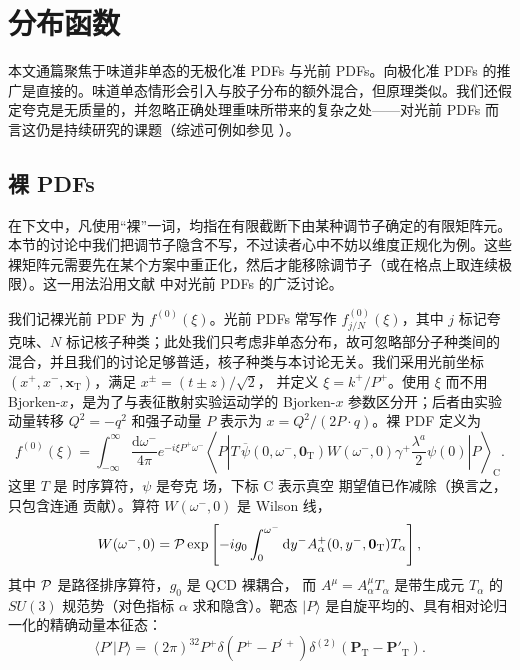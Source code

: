 \section{\label{sec:defs}分布函数}


本文通篇聚焦于味道非单态的无极化准 PDFs 与光前 PDFs。向极化准 PDFs 的推广是直接的。味道单态情形会引入与胶子分布的额外混合，但原理类似。我们还假定夸克是无质量的，并忽略正确处理重味所带来的复杂之处——对光前 PDFs 而言这仍是持续研究的课题（综述可例如参见
\cite{Thorne:2008xf,Olness:2008px,Binoth:2010nha}）。

\subsection{裸 PDFs}

在下文中，凡使用“裸”一词，均指在有限截断下由某种调节子确定的有限矩阵元。本节的讨论中我们把调节子隐含不写，不过读者心中不妨以维度正规化为例。这些裸矩阵元需要先在某个方案中重正化，然后才能移除调节子（或在格点上取连续极限）。这一用法沿用文献
\cite{Collins:1981uw,Collins:2011zzd} 中对光前 PDFs 的广泛讨论。

我们记裸光前 PDF 为
$f^{(0)}(\xi)$。光前 PDFs 常写作
$f_{j/N}^{(0)}(\xi)$，其中 $j$
标记夸克味、$N$ 标记核子种类；此处我们只考虑非单态分布，故可忽略部分子种类间的混合，并且我们的讨论足够普适，核子种类与本讨论无关。我们采用光前坐标
$(x^+,x^-,\boldsymbol{x}_\mathrm{T})$，满足 $x^\pm = (t\pm z)/\sqrt{2}$，
并定义 $\xi=k^+/P^+$。使用 $\xi$ 而不用 Bjorken-$x$，是为了与表征散射实验运动学的 Bjorken-$x$ 参数区分开；后者由实验动量转移 $Q^2=-q^2$ 和强子动量 $P$
表示为 $x=Q^2/(2P\cdot q)$。裸 PDF 定义为 \cite{Collins:2011zzd}
\begin{equation}
f^{(0)}(\xi) = \int_{-\infty}^\infty
\frac{\mathrm{d}\omega^-}{4\pi}
e^{-i\xi P^+\omega^-} \left\langle P \left|
T\,\overline{\psi}(0,\omega^-,\mathbf{0}_\mathrm{T})
W(\omega^-,0)\gamma^+\frac{\lambda^a}{2}\psi(0) \right|
P\right\rangle_\mathrm{C}.
\end{equation}
这里 $T$ 是
时序算符，$\psi$ 是夸克
场，下标 C 表示真空
期望值已作减除（换言之，只包含连通
贡献）。算符 $W(\omega^-,0)$ 是 Wilson 线，
\begin{equation}
W(\omega^-,0) =
{\cal P}\exp\left[-ig_0\int_0^{\omega^-}\mathrm{d}y^-A^+_\alpha(0,y^-,
\mathbf{0}_{\mathrm{T}})T_\alpha\right],
\end{equation}
其中 ${\cal P}$ 是路径排序算符，$g_0$ 是 QCD 裸耦合，
而 $A^\mu = A^\mu_\alpha T_\alpha$ 是带生成元
$T_\alpha$ 的 $SU(3)$ 规范势（对色指标 $\alpha$ 求和隐含）。靶态
$|P\rangle$ 是自旋平均的、具有相对论归一化的精确动量本征态：
\begin{equation}
\langle P' | P \rangle =
(2\pi)^32P^+\delta\left(P^+-P^{\prime\,+}\right)\delta^{(2)}
\left(\mathbf{P}_\mathrm{T} - \mathbf{P}'_\mathrm{T}\right).
\end{equation}

